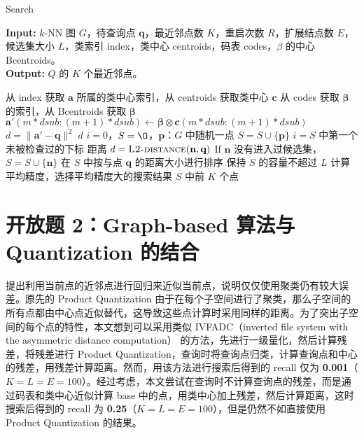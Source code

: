 \documentclass{article}
\newcommand{\tb}[1]{\textbf{#1}}
\begin{document}
\begin{algorithm}[ht]
\setlength{\abovecaptionskip}{0.cm}
\small
\caption{Search} %
\hspace*{0.02in} {\bf Input:} %
	$k$-NN 图 $G$，待查询点 $\tb q$，最近邻点数 $K$，重启次数 $R$，扩展结点数 $E$，候选集大小 $L$，类索引 index，类中心 centroids，码表 codes，$\beta$ 的中心 Bcentroids。 \\
\hspace*{0.02in} {\bf Output:} %
	$Q$ 的 $K$ 个最近邻点。
\begin{algorithmic}[1]
\Procedure{L2-distance}{$\tb a, \tb q$}
		\State 从 index 获取 $\tb a$ 所属的类中心索引，从 centroids 获取类中心 $\tb c$
				\State 从 codes 获取 $\boldsymbol \beta$ 的索引，从 Bcentroids 获取 $\boldsymbol \beta$
				\State $\tb a'(m * dsub : (m + 1) * dsub) \leftarrow \boldsymbol \beta \otimes \tb c(m * dsub : (m + 1) * dsub)$
		\EndFor
		\State $d = \lVert \tb a' - \tb q \rVert ^2$
		\State \Return $d$
\EndProcedure
{}
		\State $i = 0$，$S = \O$，$\tb p$：$G$ 中随机一点
		\State $S = S \cup \{ \tb p\}$
				\State $i = S$ 中第一个未被检查过的下标
				\For{$ \tb n$ in $N(\tb p_i, E, G)$}
						\State 距离 $d = \Call{L2-distance}{\tb n, \tb q}$
						\State If $ \tb n$ 没有进入过候选集，$S = S \cup \{ \tb n\}$
				\EndFor
				\State 在 $S$ 中按与点 $\tb q$ 的距离大小进行排序
				\State 保持 $S$ 的容量不超过 $L$
		\EndWhile
		\State 计算平均精度，选择平均精度大的搜索结果
\EndFor
\State \Return $S$ 中前 $K$ 个点
\end{algorithmic}
\end{algorithm}


\section{开放题 2：Graph-based 算法与 Quantization 的结合}

\cite{ref8} 提出利用当前点的近邻点进行回归来近似当前点，说明仅仅使用聚类仍有较大误差。原先的 Product Quantization 由于在每个子空间进行了聚类，那么子空间的所有点都由中心点近似替代，这导致这些点计算时采用同样的距离。为了突出子空间的每个点的特性，本文想到可以采用类似 IVFADC（inverted file system with the asymmetric distance computation）\cite{ref9} 的方法，先进行一级量化，然后计算残差，将残差进行 Product Quantization，查询时将查询点归类，计算查询点和中心的残差，用残差计算距离。然而，用该方法进行搜索后得到的 recall 仅为 \tb{0.001}（$K = L = E = 100$）。经过考虑，本文尝试在查询时不计算查询点的残差，而是通过码表和类中心近似计算 base 中的点，用类中心加上残差，然后计算距离，这时搜索后得到的 recall 为 \tb{0.25}（$K = L = E = 100$），但是仍然不如直接使用 Product Quantization 的结果。
\end{document}
